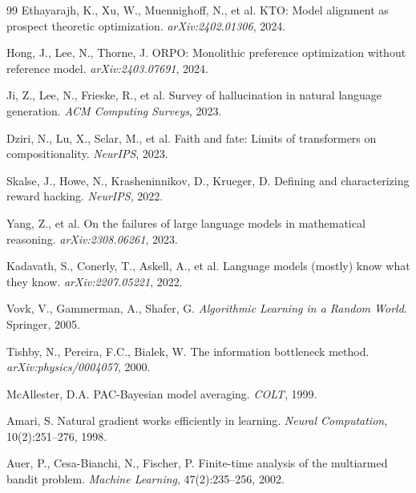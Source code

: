\documentclass[11pt,a4paper]{article}
\begin{document}
\begin{thebibliography}{99}
Ethayarajh, K., Xu, W., Muennighoff, N., et al.
\newblock KTO: Model alignment as prospect theoretic optimization.
\newblock \emph{arXiv:2402.01306}, 2024.

Hong, J., Lee, N., Thorne, J.
\newblock ORPO: Monolithic preference optimization without reference model.
\newblock \emph{arXiv:2403.07691}, 2024.

Ji, Z., Lee, N., Frieske, R., et al.
\newblock Survey of hallucination in natural language generation.
\newblock \emph{ACM Computing Surveys}, 2023.

Dziri, N., Lu, X., Sclar, M., et al.
\newblock Faith and fate: Limits of transformers on compositionality.
\newblock \emph{NeurIPS}, 2023.

Skalse, J., Howe, N., Krasheninnikov, D., Krueger, D.
\newblock Defining and characterizing reward hacking.
\newblock \emph{NeurIPS}, 2022.

Yang, Z., et al.
\newblock On the failures of large language models in mathematical reasoning.
\newblock \emph{arXiv:2308.06261}, 2023.

Kadavath, S., Conerly, T., Askell, A., et al.
\newblock Language models (mostly) know what they know.
\newblock \emph{arXiv:2207.05221}, 2022.

Vovk, V., Gammerman, A., Shafer, G.
\newblock \emph{Algorithmic Learning in a Random World}.
\newblock Springer, 2005.

Tishby, N., Pereira, F.C., Bialek, W.
\newblock The information bottleneck method.
\newblock \emph{arXiv:physics/0004057}, 2000.

McAllester, D.A.
\newblock PAC-Bayesian model averaging.
\newblock \emph{COLT}, 1999.

Amari, S.
\newblock Natural gradient works efficiently in learning.
\newblock \emph{Neural Computation}, 10(2):251--276, 1998.

Auer, P., Cesa-Bianchi, N., Fischer, P.
\newblock Finite-time analysis of the multiarmed bandit problem.
\newblock \emph{Machine Learning}, 47(2):235--256, 2002.

\end{thebibliography}
\end{document}
